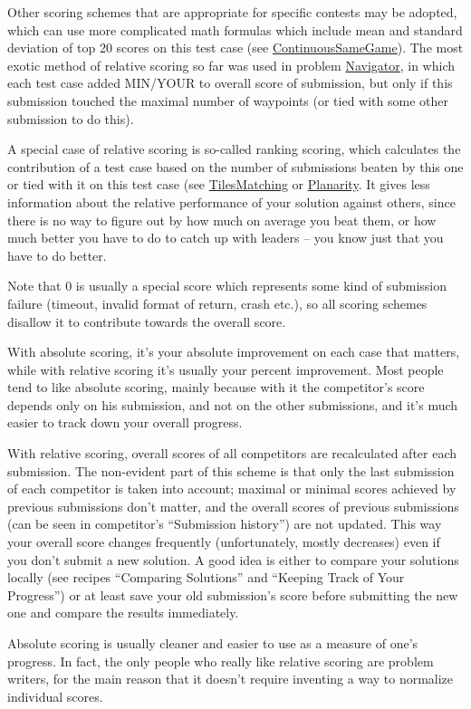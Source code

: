 Other scoring schemes that are appropriate for specific contests may be
adopted, which can use more complicated math formulas which include mean
and standard deviation of top 20 scores on this test case (see
\href{http://www.topcoder.com/longcontest/?module=ViewProblemStatement\&rd=10815\&pm=7789}{ContinuousSameGame}).
The most exotic method of relative scoring so far was used in problem
\href{http://www.topcoder.com/longcontest/?module=ViewProblemStatement\&rd=10845\&pm=7892}{Navigator},
in which each test case added MIN/YOUR to overall score of submission,
but only if this submission touched the maximal number of waypoints (or
tied with some other submission to do this).

A special case of relative scoring is so-called ranking scoring, which
calculates the contribution of a test case based on the number of
submissions beaten by this one or tied with it on this test case (see
\href{https://community.topcoder.com/longcontest/?module=ViewProblemStatement\&rd=13795\&pm=10410}{TilesMatching}
or
\href{https://community.topcoder.com/longcontest/?module=ViewProblemStatement\&rd=14272\&pm=10942}{Planarity}.
It gives less information about the relative performance of your
solution against others, since there is no way to figure out by how much
on average you beat them, or how much better you have to do to catch up
with leaders -- you know just that you have to do better.

Note that 0 is usually a special score which represents some kind of
submission failure (timeout, invalid format of return, crash etc.), so
all scoring schemes disallow it to contribute towards the overall score.

With absolute scoring, it's your absolute improvement on each case that
matters, while with relative scoring it's usually your percent
improvement. Most people tend to like absolute scoring, mainly because
with it the competitor's score depends only on his submission, and not
on the other submissions, and it's much easier to track down your
overall progress.

With relative scoring, overall scores of all competitors are
recalculated after each submission. The non-evident part of this scheme
is that only the last submission of each competitor is taken into
account; maximal or minimal scores achieved by previous submissions
don't matter, and the overall scores of previous submissions (can be
seen in competitor's ``Submission history'') are not updated. This way
your overall score changes frequently (unfortunately, mostly decreases)
even if you don't submit a new solution. A good idea is either to
compare your solutions locally (see recipes ``Comparing Solutions'' and
``Keeping Track of Your Progress'') or at least save your old
submission's score before submitting the new one and compare the results
immediately.

Absolute scoring is usually cleaner and easier to use as a measure of
one's progress. In fact, the only people who really like relative
scoring are problem writers, for the main reason that it doesn't require
inventing a way to normalize individual scores.
